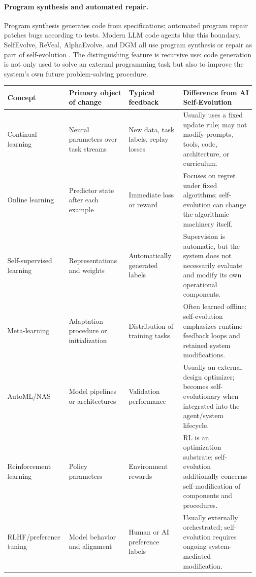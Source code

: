\paragraph{Program synthesis and automated repair.} Program synthesis generates code from specifications; automated program repair patches bugs according to tests. Modern LLM code agents blur this boundary. SelfEvolve, ReVeal, AlphaEvolve, and DGM all use program synthesis or repair as part of self-evolution \cite{selfevolve2023,reveal2025,alphaevolve2025,darwingodelmachine2025}. The distinguishing feature is recursive use: code generation is not only used to solve an external programming task but also to improve the system's own future problem-solving procedure.

\begin{table}[t]
\centering
{\TableTight
\begin{tabularx}{\textwidth}{@{}L{0.16\textwidth}L{0.20\textwidth}L{0.23\textwidth}Y@{}}
\toprule
\textbf{Concept} & \textbf{Primary object of change} & \textbf{Typical feedback} & \textbf{Difference from AI Self-Evolution} \\
\midrule
Continual learning & Neural parameters over task streams & New data, task labels, replay losses & Usually uses a fixed update rule; may not modify prompts, tools, code, architecture, or curriculum. \\
Online learning & Predictor state after each example & Immediate loss or reward & Focuses on regret under fixed algorithms; self-evolution can change the algorithmic machinery itself. \\
Self-supervised learning & Representations and weights & Automatically generated labels & Supervision is automatic, but the system does not necessarily evaluate and modify its own operational components. \\
Meta-learning & Adaptation procedure or initialization & Distribution of training tasks & Often learned offline; self-evolution emphasizes runtime feedback loops and retained system modifications. \\
AutoML/NAS & Model pipelines or architectures & Validation performance & Usually an external design optimizer; becomes self-evolutionary when integrated into the agent/system lifecycle. \\
Reinforcement learning & Policy parameters & Environment rewards & RL is an optimization substrate; self-evolution additionally concerns self-modification of components and procedures. \\
RLHF/preference tuning & Model behavior and alignment & Human or AI preference labels & Usually externally orchestrated; self-evolution requires ongoing system-mediated modification. \\

\end{tabularx}}
\end{table}
